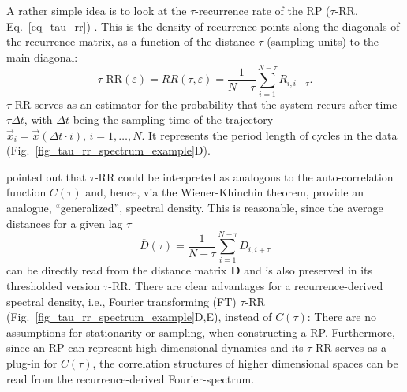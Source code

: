 \documentclass[entropy,article,submit,pdftex,moreauthors]{Definitions/mdpi}
\begin{document}
A rather simple idea is to look at the $\tau$-recurrence rate of the RP ($\tau$-RR, Eq.~\ref{eq_tau_rr}) \cite{marwan2002pla,Zbilut2008}.
This is the density of recurrence points along the diagonals of the recurrence matrix, as a function of the distance $\tau$ (sampling units) to the main diagonal:
\begin{equation}\label{eq_tau_rr}
\tau\text{-RR}(\varepsilon) = RR(\tau, \varepsilon) = \frac{1}{N-\tau} \sum_{i=1}^{N-\tau	} R_{i,i+\tau}.
\end{equation}
$\tau$-RR serves as an estimator for the probability that the system recurs after time $\tau \Delta t$, with $\Delta t$ being the sampling time of the trajectory 
$\vec{x}_i = \vec{x}(\Delta t \cdot i),\, i=1,\ldots,N$. 
It represents the period length of cycles in the data (Fig.~\ref{fig_tau_rr_spectrum_example}D).

\citet{Zbilut2008} pointed out that $\tau$-RR could be interpreted as analogous to the auto-correlation function $C(\tau)$ and, hence, via the Wiener-Khinchin theorem, provide an analogue,
``generalized'', spectral density. This is reasonable, since the average distances for a given lag $\tau$ 
\begin{equation}
\overline{D}(\tau) = \frac{1}{N-\tau}\sum_{i=1}^{N-\tau} D_{i, i+\tau}
\end{equation}
can be directly read from the distance matrix $\mathbf{D}$ and is also preserved in its thresholded version $\tau$-RR. There are clear advantages for a recurrence-derived spectral density, 
i.e., Fourier transforming (FT) $\tau$-RR (Fig.~\ref{fig_tau_rr_spectrum_example}D,E), instead 
of $C(\tau)$: There are no assumptions for stationarity or sampling, when constructing a RP.
Furthermore, since an RP can represent high-dimensional dynamics and its $\tau$-RR serves as a plug-in for $C(\tau)$, the correlation structures of higher dimensional spaces can be read from 
the recurrence-derived Fourier-spectrum.\\
\end{document}
